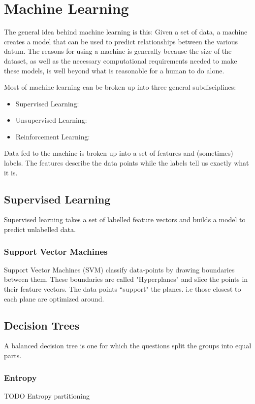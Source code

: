 
\chapter{Machine Learning}

The general idea behind machine learning is this: Given a set of data, a machine creates a model that can be used to predict relationships between the various datum. The reasons for using a machine is generally because the size of the dataset, as well as the necessary computational requirements needed to make these models, is well beyond what is reasonable for a human to do alone.

Most of machine learning can be broken up into three general subdisciplines:
\begin{itemize}
	\item Supervised Learning:
	\item Unsupervised Learning:
	\item Reinforcement Learning:
\end{itemize}

Data fed to the machine is broken up into a set of features and (sometimes) labels. The features describe the data points while the labels tell us exactly what it is.



\section{Supervised Learning}
Supervised learning takes a set of labelled feature vectors and builds a model to predict unlabelled data.



\subsection{Support Vector Machines}
Support Vector Machines (SVM) classify data-points by drawing boundaries between them. These boundaries are called "Hyperplanes" and slice the points in their feature vectors. The data points “support" the planes. i.e those closest to each plane are optimized around.

\section{Decision Trees}
A balanced decision tree is one for which the questions split the groups into equal parts.

\subsection{Entropy}
TODO Entropy partitioning


